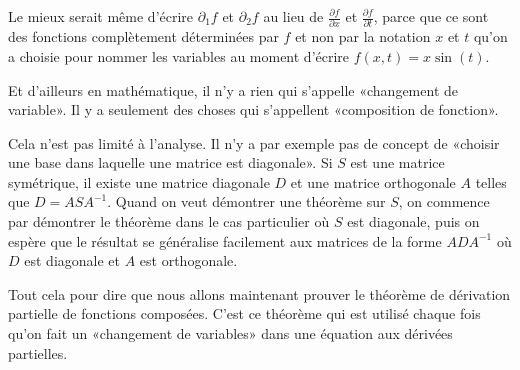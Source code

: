 Le mieux serait même d'écrire \( \partial_1f\) et \( \partial_2f\) au lieu de \( \frac{ \partial f }{ \partial x }\) et \( \frac{ \partial f }{ \partial t }\), parce que ce sont des fonctions complètement déterminées par \( f\) et non par la notation \( x\) et \( t\) qu'on a choisie pour nommer les variables au moment d'écrire \( f(x,t)=x\sin(t)\).

\begin{normaltext}
	Et d'ailleurs en mathématique, il n'y a rien qui s'appelle «changement de variable». Il y a seulement des choses qui s'appellent «composition de fonction».

	Cela n'est pas limité à l'analyse. Il n'y a par exemple pas de concept de «choisir une base dans laquelle une matrice est diagonale». Si \(S\) est une matrice symétrique, il existe une matrice diagonale \( D\) et une matrice orthogonale \( A \) telles que \( D=ASA^{-1}\). Quand on veut démontrer une théorème sur \( S\), on commence par démontrer le théorème dans le cas particulier où \( S\) est diagonale, puis on espère que le résultat se généralise facilement aux matrices de la forme \( ADA^{-1}\) où \( D\) est diagonale et \( A\) est orthogonale.
\end{normaltext}

\begin{normaltext}
	Tout cela pour dire que nous allons maintenant prouver le théorème de dérivation partielle de fonctions composées. C'est ce théorème qui est utilisé chaque fois qu'on fait un «changement de variables» dans une équation aux dérivées partielles.
\end{normaltext}


